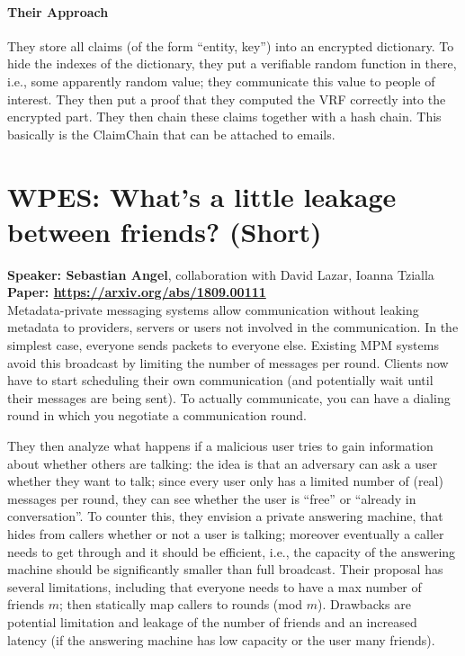 \documentclass{article}
\begin{document}
\paragraph{Their Approach}
They store all claims (of the form ``entity, key'') into an encrypted dictionary. To hide the indexes of the dictionary, they put a verifiable random function in there, i.e., some apparently random value; they communicate this value to people of interest. They then put a proof that they computed the VRF correctly into the encrypted part. They then chain these claims together with a hash chain. This basically is the ClaimChain that can be attached to emails.


\section{WPES: What's a little leakage between friends? (Short)}
\noindent\textbf{Speaker: Sebastian Angel}, collaboration with David Lazar, Ioanna Tzialla\\
\noindent\textbf{Paper: \url{https://arxiv.org/abs/1809.00111}}\\

Metadata-private messaging systems allow communication without leaking metadata to providers, servers or users not involved in the communication. In the simplest case, everyone sends packets to everyone else. Existing MPM systems avoid this broadcast by limiting the number of messages per round. Clients now have to start scheduling their own communication (and potentially wait until their messages are being sent). To actually communicate, you can have a dialing round in which you negotiate a communication round.

They then analyze what happens if a malicious user tries to gain information about whether others are talking: the idea is that an adversary can ask a user whether they want to talk; since every user only has a limited number of (real) messages per round, they can see whether the user is ``free'' or ``already in conversation''. To counter this, they envision a private answering machine, that hides from callers whether or not a user is talking; moreover eventually a caller needs to get through and it should be efficient, i.e., the capacity of the answering machine should be significantly smaller than full broadcast. Their proposal has several limitations, including that everyone needs to have a max number of friends $m$; then statically map callers to rounds (mod $m$). Drawbacks are potential limitation and leakage of the number of friends and an increased latency (if the answering machine has low capacity or the user many friends).
\end{document}
